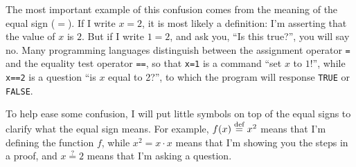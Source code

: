 The most important example of this confusion comes from the meaning of the equal sign
($=$). If I write $x=2$, it is most likely a definition: I'm asserting that the value
of $x$ is $2$. But if I write $1=2$, and ask you, ``Is this true?'', you will say no.
Many programming languages distinguish between the assignment operator \texttt{=} and the
equality test operator \texttt{==}, so that \texttt{x=1} is a command ``set $x$ to $1$!'',
while \texttt{x==2} is a question ``is $x$ equal to 2?'', to which the program will
response \texttt{TRUE} or \texttt{FALSE}.

To help ease some confusion, I will put little symbols on top of the equal signs to
clarify what the equal sign means. For example, $f(x) \stackrel{\text{def}}{=} x^2$ means that I'm defining
the function $f$, while $x^2 = x \cdot x$ means that I'm showing you the steps in a proof, and $x \stackrel{?}{=} 2$ means that I'm asking a question.
